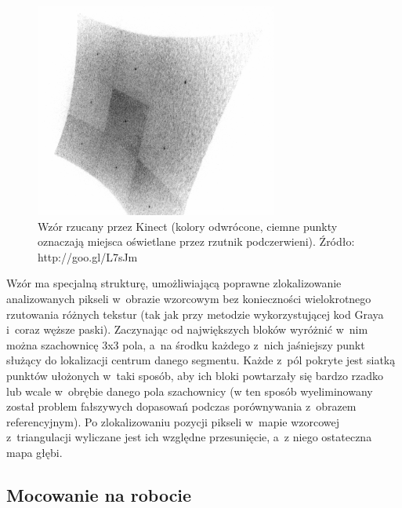\begin{figure}[h!]
\centering
\includegraphics[width=8cm]{../img/kinect_pattern}
\caption[Wzór rzucany przez Kinect]{Wzór rzucany przez Kinect (kolory odwrócone,
ciemne punkty oznaczają miejsca oświetlane przez rzutnik podczerwieni). Źródło:
http://goo.gl/L7sJm}
\label{fig:kinect_pattern}
\end{figure}

Wzór ma specjalną strukturę, umożliwiającą poprawne zlokalizowanie analizowanych
pikseli w~obrazie wzorcowym bez konieczności wielokrotnego rzutowania różnych
tekstur (tak jak przy metodzie wykorzystującej kod Graya i~coraz węższe paski).
Zaczynając od największych bloków wyróżnić w~nim można szachownicę 3x3 pola,
a~na środku każdego z~nich jaśniejszy punkt służący do lokalizacji centrum danego
segmentu. Każde z~pól pokryte jest siatką punktów ułożonych w~taki sposób, aby
ich bloki powtarzały się bardzo rzadko lub wcale w~obrębie danego pola
szachownicy (w ten sposób wyeliminowany został problem fałszywych dopasowań
podczas porównywania z~obrazem referencyjnym). Po zlokalizowaniu pozycji
pikseli w~mapie wzorcowej z~triangulacji wyliczane jest ich względne
przesunięcie, a~z niego ostateczna mapa głębi.

\subsection{Mocowanie na robocie}

